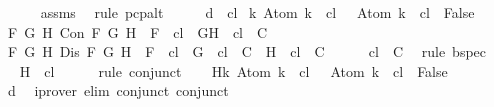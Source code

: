 \begin{isabellebody}
\ \ \ \ \isamarkupfalse%
\ assms{\isacharparenleft}{}{\isacharparenright}\ \isamarkupfalse%
\ {\isacharparenleft}rule\ pcp{\isacharunderscore}alt{}{\isacharparenright}\isanewline
\ \ \isamarkupfalse%
\ \isamarkupfalse%
\ d{\isacharcolon}{\isachardoublequoteopen}{\isasymbottom}\ {\isasymnotin}\ {\isacharquery}cl\isanewline
{\isasymand}\ {\isacharparenleft}{\isasymforall}k{\isachardot}\ Atom\ k\ {\isasymin}\ {\isacharquery}cl\ {\isasymlongrightarrow}\ \isactrlbold {\isasymnot}\ {\isacharparenleft}Atom\ k{\isacharparenright}\ {\isasymin}\ {\isacharquery}cl\ {\isasymlongrightarrow}\ False{\isacharparenright}\isanewline
{\isasymand}\ {\isacharparenleft}{\isasymforall}F\ G\ H{\isachardot}\ Con\ F\ G\ H\ {\isasymlongrightarrow}\ F\ {\isasymin}\ {\isacharquery}cl\ {\isasymlongrightarrow}\ {\isacharbraceleft}G{\isacharcomma}H{\isacharbraceright}\ {\isasymunion}\ {\isacharquery}cl\ {\isasymin}\ C{\isacharparenright}\isanewline
{\isasymand}\ {\isacharparenleft}{\isasymforall}F\ G\ H{\isachardot}\ Dis\ F\ G\ H\ {\isasymlongrightarrow}\ F\ {\isasymin}\ {\isacharquery}cl\ {\isasymlongrightarrow}\ {\isacharbraceleft}G{\isacharbraceright}\ {\isasymunion}\ {\isacharquery}cl\ {\isasymin}\ C\ {\isasymor}\ {\isacharbraceleft}H{\isacharbraceright}\ {\isasymunion}\ {\isacharquery}cl\ {\isasymin}\ C{\isacharparenright}{\isachardoublequoteclose}\isanewline
\ \ \ \ \isamarkupfalse%
\ {\isacartoucheopen}{\isacharquery}cl\ {\isasymin}\ C{\isacartoucheclose}\ \isamarkupfalse%
\ {\isacharparenleft}rule\ bspec{\isacharparenright}\isanewline
\ \ \isamarkupfalse%
\ \isamarkupfalse%
\ H{}{\isacharcolon}{\isachardoublequoteopen}{\isasymbottom}\ {\isasymnotin}\ {\isacharquery}cl{\isachardoublequoteclose}\isanewline
\ \ \ \ \isamarkupfalse%
\ {\isacharparenleft}rule\ conjunct{}{\isacharparenright}\isanewline
\ \ \isamarkupfalse%
\ H{}{\isacharcolon}{\isachardoublequoteopen}{\isasymforall}k{\isachardot}\ Atom\ k\ {\isasymin}\ {\isacharquery}cl\ {\isasymlongrightarrow}\ \isactrlbold {\isasymnot}\ {\isacharparenleft}Atom\ k{\isacharparenright}\ {\isasymin}\ {\isacharquery}cl\ {\isasymlongrightarrow}\ False{\isachardoublequoteclose}\isanewline
\ \ \ \ \isamarkupfalse%
\ d\ \isamarkupfalse%
\ {\isacharparenleft}iprover\ elim{\isacharcolon}\ conjunct{}\ conjunct{}{\isacharparenright}\isanewline
\ \ \isamarkupfalse%

\end{isabellebody}
